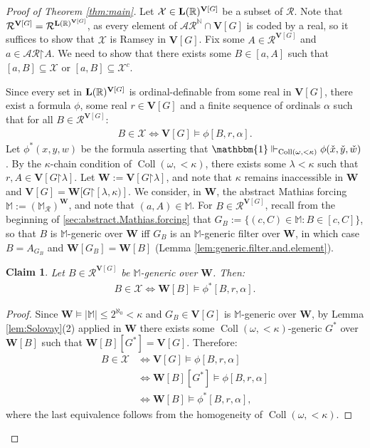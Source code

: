 \documentclass[10pt,a4paper]{amsart}
\theoremstyle{plain}
\numberwithin{equation}{section}
\newtheorem{claim}[theorem]{Claim}
\theoremstyle{definition}
\newcommand{\func}{\operatorname}
\newcommand{\R}{\mathbb{R}}
\newcommand{\N}{\mathbb{N}}
\newcommand{\cal}{\mathcal}
\renewcommand{\bf}{\mathbf}
\newcommand{\forces}{\Vdash}
\newcommand{\one}{\mathbbm{1}}
\newcommand{\restrictedto}{\mathord{\upharpoonright}}
\newcommand{\Coll}{\func{Coll}}
\newcommand{\V}{\bf{V}}
\newcommand{\W}{\bf{W}}
\newcommand{\X}{\cal{X}}
\DeclareRobustCommand{\L}{\ifmmode\mathbf{L}\else\strokeL\fi}
\DeclareRobustCommand{\S}{\ifmmode\mathcal{S}\else\Sec\fi}
\newenvironment{midproof}[1][Proof]
  {\begin{proof}[#1]\renewcommand{\qedsymbol}{$\blacksquare$}}
  {\end{proof}}
\begin{document}
\begin{proof}[Proof of Theorem \ref{thm:main}]
    Let $\X \in \L(\R)^{\V[G]}$ be a subset of $\cal{R}$. Note that $\cal{R}^{\V[G]} = \cal{R}^{\L(\R)^{\V[G]}}$, as every element of $\cal{AR}^\N \cap \V[G]$ is coded by a real, so it suffices to show that $\X$ is Ramsey in $\V[G]$. Fix some $A \in \cal{R}^{\V[G]}$ and $a \in \cal{AR}\restrictedto A$. We need to show that there exists some $B \in [a,A]$ such that $[a,B] \subseteq \X$ or $[a,B] \subseteq \X^c$.
    
    Since every set in $\L(\R)^{\V[G]}$ is ordinal-definable from some real in $\V[G]$, there exist a formula $\phi$, some real $r \in \V[G]$ and a finite sequence of ordinals $\alpha$ such that for all $B \in \cal{R}^{\V[G]}$:
    \begin{align*}
        B \in \X \iff \V[G] \models \phi[B,r,\alpha].
    \end{align*}
    Let $\phi^*(x,y,w)$ be the formula asserting that $\one \forces_{\Coll(\omega,{<}\kappa)} \phi(\check{x},\check{y},\check{w})$. By the $\kappa$-chain condition of $\Coll(\omega,{<}\kappa)$, there exists some $\lambda < \kappa$ such that $r,A \in \V[G\restrictedto\lambda]$. Let $\W := \V[G\restrictedto\lambda]$, and note that $\kappa$ remains inaccessible in $\W$ and $\V[G] = \W[G\restrictedto[\lambda,\kappa)]$. We consider, in $\W$, the abstract Mathias forcing $\mathbb{M} := (\mathbb{M}_\cal{R})^\W$, and note that $(a,A) \in \mathbb{M}$. For $B \in \cal{R}^{\V[G]}$, recall from the beginning of \S\ref{sec:abstract.Mathias.forcing} that $G_B := \{(c,C) \in \mathbb{M} : B \in [c,C]\}$, so that $B$ is $\mathbb{M}$-generic over $\W$ iff $G_B$ is an $\mathbb{M}$-generic filter over $\W$, in which case $B = A_{G_B}$ and $\W[G_B] = \W[B]$ (Lemma \ref{lem:generic.filter.and.element}).

    \begin{claim}
    \label{claim:generic.in.X}
        Let $B \in \cal{R}^{\V[G]}$ be $\mathbb{M}$-generic over $\W$. Then:
        \begin{align*}
            B \in \X \iff \W[B] \models \phi^*[B,r,\alpha].
        \end{align*}
    \end{claim}

    \begin{midproof}
        Since $\W \models |\mathbb{M}| \leq 2^{\aleph_0} < \kappa$ and $G_B \in \V[G]$ is $\mathbb{M}$-generic over $\W$, by Lemma \ref{lem:Solovay}(2) applied in $\W$ there exists some $\Coll(\omega,{<}\kappa)$-generic $G^*$ over $\W[B]$ such that $\W[B][G^*] = \V[G]$. Therefore:
        \begin{align*}
            B \in \X &\iff \V[G] \models \phi[B,r,\alpha] \\
            &\iff \W[B][G^*] \models \phi[B,r,\alpha] \\
            &\iff \W[B] \models \phi^*[B,r,\alpha],
        \end{align*}
        where the last equivalence follows from the homogeneity of $\Coll(\omega,{<}\kappa)$.
    \end{midproof}


\end{proof}
\end{document}
